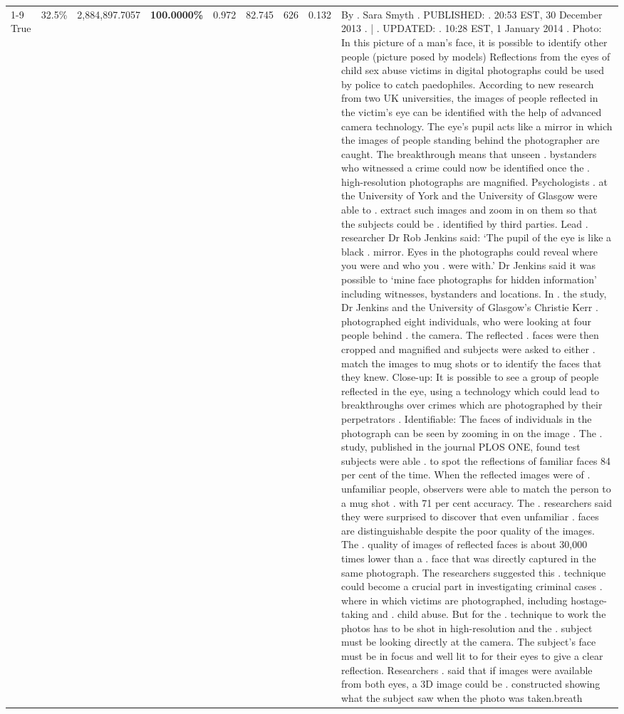 \begin{table}[H]
\begin{tabular}{lllrlllll}
\cline{1-9} \cline{2-9}
True & 32.5\% & 2,884,897.7057 & \bfseries \color{red} 100.0000\% & 0.972 & 82.745 & 626 & 0.132 & By . Sara Smyth . PUBLISHED: . 20:53 EST, 30 December 2013 . | . UPDATED: . 10:28 EST, 1 January 2014 . Photo: In this picture of a man's face, it is possible to identify other people (picture posed by models) Reflections from the eyes of child sex abuse victims in digital photographs could be used by police to catch paedophiles. According to new research from two UK universities, the images of people reflected in the victim's eye can be identified with the help of advanced camera technology. The eye's pupil acts like a mirror in which the images of people standing behind the photographer are caught. The breakthrough means that unseen . bystanders who witnessed a crime could now be identified once the . high-resolution photographs are magnified. Psychologists . at the University of York and the University of Glasgow were able to . extract such images and zoom in on them so that the subjects could be . identified by third parties. Lead . researcher Dr Rob Jenkins said: ‘The pupil of the eye is like a black . mirror. Eyes in the photographs could reveal where you were and who you . were with.' Dr Jenkins said it was possible to ‘mine face photographs for hidden information' including witnesses, bystanders and locations. In . the study, Dr Jenkins and the University of Glasgow's Christie Kerr . photographed eight individuals, who were looking at four people behind . the camera. The reflected . faces were then cropped and magnified and subjects were asked to either . match the images to mug shots or to identify the faces that they knew. Close-up: It is possible to see a group of people reflected in the eye, using a technology which could lead to breakthroughs over crimes which are photographed by their perpetrators . Identifiable: The faces of individuals in the photograph can be seen by zooming in on the image . The . study, published in the journal PLOS ONE, found test subjects were able . to spot the reflections of familiar faces 84 per cent of the time. When the reflected images were of . unfamiliar people, observers were able to match the person to a mug shot . with 71 per cent accuracy. The . researchers said they were surprised to discover that even unfamiliar . faces are distinguishable despite the poor quality of the images. The . quality of images of reflected faces is about 30,000 times lower than a . face that was directly captured in the same photograph. The researchers suggested this . technique could become a crucial part in investigating criminal cases . where in which victims are photographed, including hostage-taking and . child abuse. But for the . technique to work the photos has to be shot in high-resolution and the . subject must be looking directly at the camera. The subject's face must be in focus and well lit to for their eyes to give a clear reflection. Researchers . said that if images were available from both eyes, a 3D image could be . constructed showing what the subject saw when the photo was taken.breath \\

\end{tabular}
\end{table}
